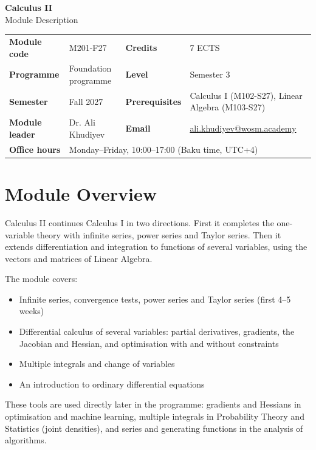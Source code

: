 \documentclass[11pt,a4paper]{article}
\makeatletter
\newcommand{\ModuleTitle}{Calculus II}
\newcommand{\ModuleCode}{M201-F27}
\newcommand{\Programme}{Foundation programme}
\newcommand{\Level}{Semester 3}
\newcommand{\Semester}{Fall 2027}
\newcommand{\Credits}{7 ECTS}
\newcommand{\ModuleLeader}{Dr. Ali Khudiyev}
\newcommand{\Email}{ali.khudiyev@wosm.academy}
\newcommand{\OfficeHours}{Monday--Friday, 10:00--17:00 (Baku time, UTC+4)}
\newcommand{\Prerequisites}{Calculus I (M102-S27), Linear Algebra (M103-S27)}
\makeatother
\begin{document}
\begin{center}
  {\LARGE\bfseries\color{accent} \ModuleTitle}\\[4pt]
  {\large Module Description}
\end{center}
\vspace{6pt}

\begin{tabularx}{\textwidth}{>{\bfseries}l X >{\bfseries}l X}
\toprule
Module code   & \ModuleCode    & Credits      & \Credits \\
Programme     & \Programme     & Level        & \Level \\
Semester      & \Semester      & Prerequisites & \Prerequisites \\
Module leader & \ModuleLeader  & Email        & \href{mailto:\Email}{\Email} \\
Office hours  & \multicolumn{3}{l}{\OfficeHours} \\
\bottomrule
\end{tabularx}

\section{Module Overview}
Calculus II continues Calculus I in two directions. First it completes the
one-variable theory with infinite series, power series and Taylor series. Then it
extends differentiation and integration to functions of several variables, using
the vectors and matrices of Linear Algebra.

The module covers:
\begin{itemize}
  \item Infinite series, convergence tests, power series and Taylor series
        (first 4--5 weeks)
  \item Differential calculus of several variables: partial derivatives, gradients,
        the Jacobian and Hessian, and optimisation with and without constraints
  \item Multiple integrals and change of variables
  \item An introduction to ordinary differential equations
\end{itemize}

These tools are used directly later in the programme: gradients and Hessians in
optimisation and machine learning, multiple integrals in Probability Theory and
Statistics (joint densities), and series and generating functions in the analysis
of algorithms.
\end{document}
